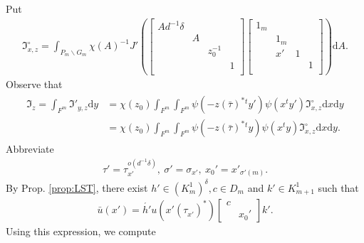 \documentclass[11pt]{amsart}
\newcommand\s{\sigma}%
\newcommand\If{\mathfrak{I}}
\newcommand\dr{\mathrm{d}}
\newcommand\1{\mathbf{1}}
\newcommand\ac{\acute}
\newcommand\bs{\backslash}%
\newcommand\bu{\bar{u}}
\numberwithin{equation}{section}
\begin{document}
Put
\begin{align*}
\If_{x,z}^\circ = 
\int_{P_m \bs G_m} \chi(A)^{-1} J'(\begin{bmatrix}
A d^{-1} \delta & & &  \\
& A &   & \\
& &z_{0}^{-1} &  \\
& & &1  \\
\end{bmatrix}
\begin{bmatrix}
1_m & & &  \\
& 1_m & & \\
& x' & 1 &  \\
& & &1  \\
\end{bmatrix}) \dr A. 
\end{align*} 
Observe that 
\begin{align}
\begin{split}
\If_z = \int_{F^m} \If'_{y,z} \dr y &= \chi(z_0) \int_{F^m}\int_{F^m} \psi(-z(\bar{\tau})^*{}^ty') \psi(x{}^ty') \If_{x, z}^\circ \dr x \dr y \\
&= \chi(z_0) \int_{F^m}\int_{F^m} \psi(-z(\bar{\tau})^*{}^ty)\psi(x{}^ty) \If_{x, z}^\circ \dr x \dr y.
\end{split} \label{eq:Ifz=}
\end{align} 
Abbreviate
\begin{align*}
\tau' = \tau_{x'}^{o(d^{-1} \delta)},\ \s' = \s_{x'},\  x_0' = {x'}_{\s'(m)}. 
\end{align*} 
By Prop. \ref{prop:LST}, there exist $h' \in (K_m^1)^\delta, c \in D_m$ and $k' \in K_{m+1}^1$ such that 
\begin{align}
\bu(x') = \ac{h'} u(x'(\tau_{x'}^{})^*) \begin{bmatrix}
c&  \\
& x_0'
\end{bmatrix}k'. \label{eq:defc}
\end{align}
Using this expression, we compute
\end{document}
